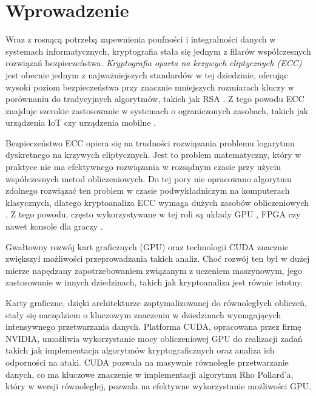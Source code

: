 \newpage
\section{Wprowadzenie}

Wraz z rosnącą potrzebą zapewnienia poufności i integralności danych w systemach
informatycznych, kryptografia stała się jednym z filarów współczesnych rozwiązań
bezpieczeństwa. \textit{Kryptografia oparta na krzywych eliptycznych (ECC)} jest
obecnie jednym z najważniejszych standardów w tej dziedzinie, oferując wysoki
poziom bezpieczeństwa przy znacznie mniejszych rozmiarach kluczy w porównaniu
do tradycyjnych algorytmów, takich jak RSA \cite[]{Ao2016,Barker2016}.
Z tego powodu ECC znajduje szerokie zastosowanie w systemach o ograniczonych zasobach, takich
jak urządzenia IoT czy urządzenia mobilne \cite[]{Thakur2022,Hammi2020}.

Bezpieczeństwo ECC opiera się na trudności rozwiązania problemu logarytmu
dyskretnego na krzywych eliptycznych. Jest to problem matematyczny, który w
praktyce nie ma efektywnego rozwiązania w rozsądnym czasie przy użyciu
współczesnych metod obliczeniowych. Do tej pory nie opracowano algorytmu
zdolnego rozwiązać ten problem w czasie podwykładniczym na komputerach klasycznych, dlatego
kryptoanaliza ECC wymaga dużych zasobów obliczeniowych \cite{Menezes2001}.
Z tego powodu, często wykorzystywane w tej roli są układy GPU \cite[]{Boss2015,Panetta2017,Bernstein2012},
FPGA \cite[]{Wenger2014,Mane2011,FPGA2008,Majkowski2008}
czy nawet konsole dla graczy \cite{Bos2010}.

Gwałtowny rozwój kart graficznych (GPU) oraz technologii CUDA znacznie zwiększył możliwości
przeprowadzania takich analiz. Choć rozwój ten był w dużej mierze napędzany
zapotrzebowaniem związanym z uczeniem maszynowym, jego zastosowanie w
innych dziedzinach, takich jak kryptoanaliza jest równie istotny.

Karty graficzne, dzięki architekturze zoptymalizowanej do równoległych obliczeń,
stały się narzędziem o kluczowym znaczeniu w dziedzinach wymagających intensywnego
przetwarzania danych. Platforma CUDA, opracowana przez firmę NVIDIA, umożliwia
wykorzystanie mocy obliczeniowej GPU do realizacji zadań takich jak
implementacja algorytmów kryptograficznych oraz analiza ich odporności na ataki.
CUDA pozwala na masywnie równoległe przetwarzanie danych, co ma kluczowe znaczenie
w implementacji algorytmu Rho Pollard'a, który w wersji równoległej, pozwala na efektywne
wykorzystanie możliwości GPU.

